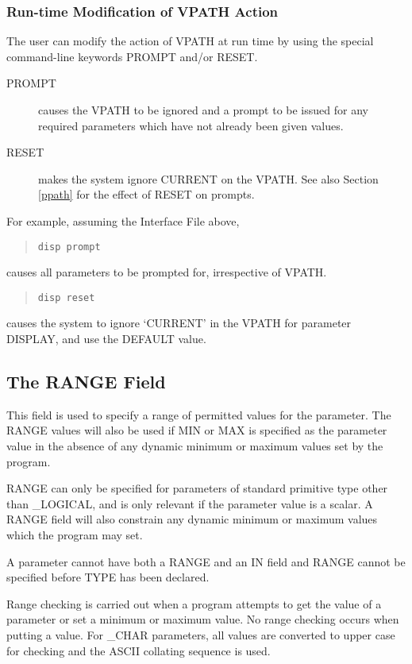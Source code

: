 \subsubsection*{Run-time Modification of VPATH Action}
The user can modify the action of VPATH at run time by using 
the special command-line keywords PROMPT and/or RESET.
\begin{description}
\item[PROMPT] causes the VPATH to be ignored and a prompt to be issued
for any required parameters which have not already been given values.
\item[RESET] makes the system ignore CURRENT on the VPATH.
See also Section \ref{ppath} for the effect of RESET on prompts.
\end{description}
For example, assuming the Interface File above,
\begin{quote} \begin{verbatim}
disp prompt
\end{verbatim} \end{quote}
causes all parameters to be prompted for, irrespective of VPATH.
\begin{quote} \begin{verbatim}
disp reset
\end{verbatim} \end{quote}
causes the system to ignore `CURRENT' in the VPATH for parameter DISPLAY,
and use the DEFAULT value.

\subsection{The RANGE Field}
\label{range}
This field is used to specify a range of permitted values for the parameter.
The RANGE values will also be used if MIN or MAX is specified as the parameter
value in the absence of any dynamic minimum or maximum values set by the
program.

RANGE can only be specified for parameters of standard primitive type other
than \_LOGICAL, and is only relevant if the parameter value is a scalar.
A RANGE field will also constrain any dynamic minimum or maximum values which
the program may set.

A parameter cannot have both a RANGE and an IN field and RANGE cannot be 
specified before TYPE has been declared. 

Range checking is carried out
when a program attempts to get the value of a parameter or set a minimum
or maximum value. No range checking occurs when putting a value. 
For \_CHAR parameters, all values are converted to upper case for checking and 
the ASCII collating sequence is used.

